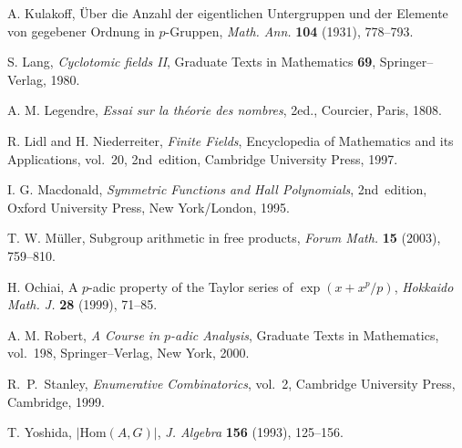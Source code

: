 \documentclass[12pt,reqno]{amsart}
\numberwithin{equation}{section}
\theoremstyle{remark}
\begin{document}
\begin{thebibliography}{99}
A. Kulakoff, \"Uber die Anzahl der eigentlichen Untergruppen und der
Elemente von gegebener Ordnung in $p$-Gruppen,
{\em Math. Ann.} {\bf 104} (1931), 778--793.

 S. Lang, {\em Cyclotomic fields II}, Graduate Texts in
Mathematics {\bf 69}, Springer--Verlag, 1980.  

A. M. Legendre, {\em Essai sur la th\'eorie des nombres}, 2ed., 
Courcier, Paris, 1808.

 R. Lidl and H. Niederreiter, \textit{Finite Fields},
Encyclopedia of Mathematics and its Applications, vol.~20, 2nd~edition,
Cambridge University Press, 1997. 

 I. G. Macdonald, {\em Symmetric Functions
and Hall Polynomials}, 2nd~edition, Oxford University
Press, New York/Lon\-don, 1995.

 T. W. M\"uller, Subgroup arithmetic in free
  products, \textit{Forum Math.} \textbf{15} (2003), 759--810. 

 H. Ochiai, A $p$-adic property of the Taylor series
  of $\exp(x + x^p/p)$, \textit{Hokkaido Math. J.} \textbf{28} (1999),
  71--85. 

 A. M. Robert, {\em A Course in $p$-adic Analysis},
Graduate Texts in Mathematics, vol.~198, Springer--Verlag,
New York, 2000.

 R.~P.~Stanley, 
{\em Enumerative Combinatorics}, vol.~2,
Cambridge University Press, Cambridge, 1999. 

 T. Yoshida, $\vert \mathrm{Hom}(A,G)\vert$,
  \textit{J. Algebra} \textbf{156} (1993), 125--156. 

\end{thebibliography}
\end{document}
